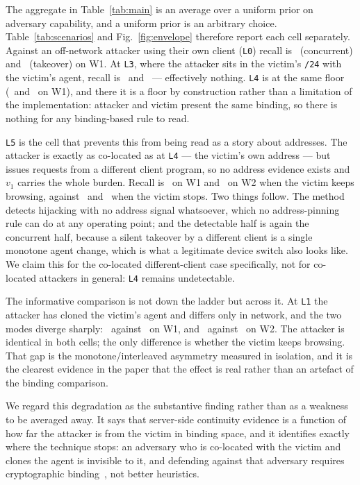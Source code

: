 \documentclass[conference]{IEEEtran}
\begin{document}
The aggregate in Table~\ref{tab:main} is an average over a uniform prior on
adversary capability, and a uniform prior is an arbitrary choice.
Table~\ref{tab:scenarios} and Fig.~\ref{fig:envelope} therefore report each cell
separately.  Against an off-network attacker using their own client
(\texttt{L0}) recall is \recLzeroConcurrentWeb\ (concurrent) and
\recLzeroTakeoverWeb\ (takeover) on W1.  At \texttt{L3}, where the attacker
sits in the victim's \texttt{/24} with the victim's agent, recall is
\recLthreeConcurrentWeb\ and \recLthreeTakeoverWeb\ --- effectively nothing.
\texttt{L4} is at the same floor (\recLfourConcurrentWeb\ and
\recLfourTakeoverWeb\ on W1), and there it is a floor by construction rather
than a limitation of the implementation: attacker and victim present the same
binding, so there is nothing for any binding-based rule to read.

\texttt{L5} is the cell that prevents this from being read as a story about
addresses.  The attacker is exactly as co-located as at \texttt{L4} --- the
victim's own address --- but issues requests from a different client program, so
no address evidence exists and $v_1$ carries the whole burden.  Recall is
\recLfiveConcurrentWeb\ on W1 and \recLfiveConcurrentApt\ on W2 when the
victim keeps browsing, against \recLfiveTakeoverWeb\ and \recLfiveTakeoverApt\
when the victim stops.  Two things follow.  The method detects hijacking with no
address signal whatsoever, which no address-pinning rule can do at any operating
point; and the detectable half is again the concurrent half, because a silent
takeover by a different client is a single monotone agent change, which is what a
legitimate device switch also looks like.  We claim this for the co-located
different-client case specifically, not for co-located attackers in general:
\texttt{L4} remains undetectable.

The informative comparison is not down the ladder but across it.  At
\texttt{L1} the attacker has cloned the victim's agent and differs only in
network, and the two modes diverge sharply: \recLoneConcurrentWeb\ against
\recLoneTakeoverWeb\ on W1, and \recLoneConcurrentApt\ against
\recLoneTakeoverApt\ on W2.  The attacker is identical in both cells; the only
difference is whether the victim keeps browsing.  That gap is the
monotone/interleaved asymmetry measured in isolation, and it is the clearest
evidence in the paper that the effect is real rather than an artefact of the
binding comparison.

We regard this degradation as the substantive finding rather than as a
weakness to be averaged away.  It says that server-side continuity evidence is
a function of how far the attacker is from the victim in binding space, and it
identifies exactly where the technique stops: an adversary who is co-located
with the victim and clones the agent is invisible to it, and defending against
that adversary requires cryptographic binding~\cite{rfc8471,rfc9449}, not better
heuristics.
\end{document}
